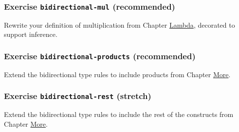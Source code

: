 \hypertarget{Inference-bidirectional-mul}{%
\subsubsection{\texorpdfstring{Exercise \texttt{bidirectional-mul}
(recommended)}{Exercise bidirectional-mul (recommended)}}\label{Inference-bidirectional-mul}}

Rewrite your definition of multiplication from Chapter
\protect\hyperlink{Lambda}{Lambda}, decorated to support inference.

\begin{fence}
\begin{code}%
\>[0]\<%
\end{code}
\end{fence}

\hypertarget{Inference-bidirectional-products}{%
\subsubsection{\texorpdfstring{Exercise \texttt{bidirectional-products}
(recommended)}{Exercise bidirectional-products (recommended)}}\label{Inference-bidirectional-products}}

Extend the bidirectional type rules to include products from Chapter
\protect\hyperlink{More}{More}.

\begin{fence}
\begin{code}%
\>[0]\<%
\end{code}
\end{fence}

\hypertarget{exercise-bidirectional-rest-stretch}{%
\subsubsection{\texorpdfstring{Exercise \texttt{bidirectional-rest}
(stretch)}{Exercise bidirectional-rest (stretch)}}\label{exercise-bidirectional-rest-stretch}}

Extend the bidirectional type rules to include the rest of the
constructs from Chapter \protect\hyperlink{More}{More}.

\begin{fence}
\begin{code}%
\>[0]\<%
\end{code}
\end{fence}

